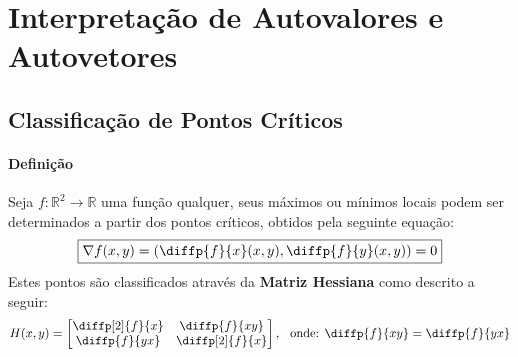 \documentclass{article}
\begin{document}
    \section{Interpretação de Autovalores e Autovetores}

        \subsection{Classificação de Pontos Críticos}
            \paragraph{Definição}Seja $f: \mathbb{R}^{2} \rightarrow \mathbb{R}$ uma função qualquer, seus máximos ou mínimos locais podem ser determinados a partir dos pontos críticos, obtidos pela seguinte equação:
                \[\boxed{\nabla f(x, y) = \left(\diffp{f}{x}(x, y), \diffp{f}{y}(x, y)\right) = 0}\]
            Estes pontos são classificados através da \textbf{Matriz Hessiana} como descrito a seguir:
                \[
                    H(x, y) =
                    \begin{bmatrix}
                        \diffp[2]{f}{x} & \diffp{f}{xy}\\
                        \diffp{f}{yx}   & \diffp[2]{f}{x}\\
                    \end{bmatrix},
                    \hspace{2.5mm}\text{onde: }
                    \diffp{f}{xy} = \diffp{f}{yx}
                \]
\end{document}
